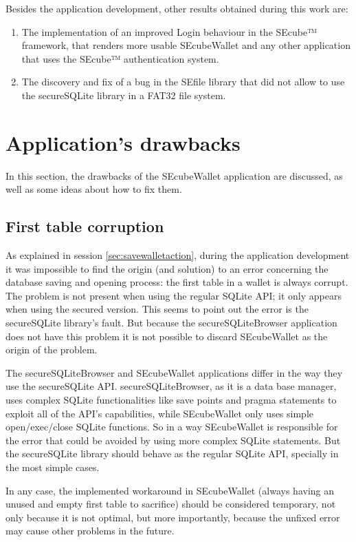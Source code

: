 Besides the application development, other results obtained during this work are:
\begin{enumerate}
\setlength\itemsep{0pt}
\item The implementation of an improved Login behaviour in the SEcube™ framework, that renders more usable SEcubeWallet and any other application that uses the SEcube™ authentication system.

\item The discovery and fix of a bug in the SEfile library that did not allow to use the secureSQLite library in a FAT32 file system.
\end{enumerate}


\section{Application's drawbacks}
In this section, the drawbacks of the SEcubeWallet application are discussed, as well as some ideas about how to fix them.


\subsection{First table corruption}
As explained in session \ref{sec:savewalletaction}, during the application development it was impossible to find the origin (and solution) to an error concerning the database saving and opening process: the first table in a wallet is always corrupt. The problem is not present when using the regular SQLite API; it only appears when using the secured version. This seems to point out the error is the secureSQLite library's fault. But because the secureSQLiteBrowser application does not have this problem it is not possible to discard SEcubeWallet as the origin of the problem.

The secureSQLiteBrowser and SEcubeWallet applications differ in the way they use the secureSQLite API. secureSQLiteBrowser, as it is a data base manager, uses complex SQLite functionalities like save points and pragma statements to exploit all of the API's capabilities, while SEcubeWallet only uses simple open/exec/close SQLite functions. So in a way SEcubeWallet is responsible for the error that could be avoided by using more complex SQLite statements. But the secureSQLite library should behave as the regular SQLite API, specially in the most simple cases.

In any case, the implemented workaround in SEcubeWallet (always having an unused and empty first table to sacrifice) should be considered temporary, not only because it is not optimal, but more importantly, because the unfixed error may cause other problems in the future.


